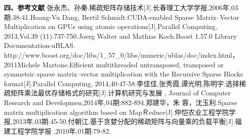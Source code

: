 \documentclass{article}
\begin{document}
 \textbf{四、参考文献}
      \qquad
\newline
  [1]张永杰、孙秦.稀疏矩阵存储技术[J].长春理工大学学报,2006年,03期:38-41.\newline
      [2]Hoang-Vu Dang,  Bertil Schmidt.CUDA-enabled Sparse Matrix–Vector Multiplication on GPUs
using atomic operations[J].Parallel Computing, 2013,Vol.39 (11):737-750.\newline
  [3]Joerg Walter and Mathias Koch.Boost 1.57.0 Library Documentation-uBLAS. http://www.boost.org/doc/libs/1\_57\_0/libs/numeric/ublas/doc/index.html， 2011\newline
  [4]Michele Martone.Efficient multithreaded untransposed, transposed or symmetric sparse matrix–vector multiplication with the Recursive Sparse Blocks format[J].Parallel Computing, 2014,40:47-58.\newline
  [5]李佳佳,张秀霞,谭光明,陈明宇.选择稀疏矩阵乘法最优存储格式的研究[J].计算机研究与发展 , Journal of Computer Research and Developmen,2014年,04期:882-894.\newline
  [6]郑建华，朱 蓉，沈玉利.Sparse matrix multiplication algorithm based on MapＲeduce[J].仲恺农业工程学院学报,2013年,03期:45-50.\newline
[7]付朝江.基于贪婪分配的稀疏矩阵与向量乘的负载平衡[J].福建工程学院学报 ,2010年,01期:79-82.\newline
\end{document}
